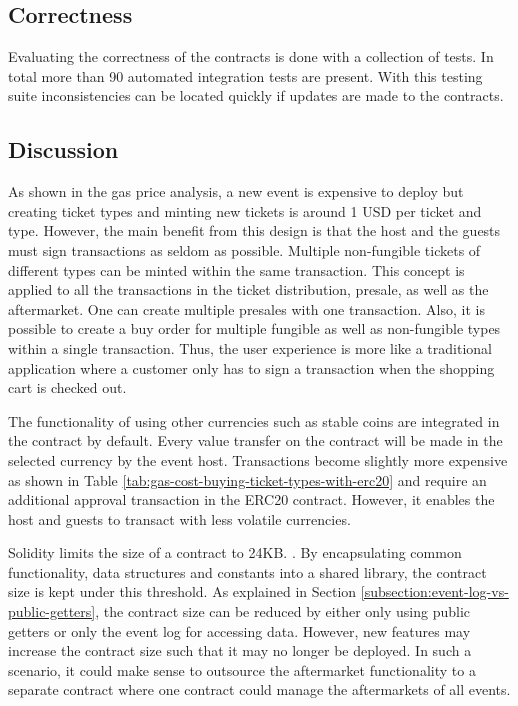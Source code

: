 \subsection{Correctness}
Evaluating the correctness of the contracts is done with a collection of tests. In total more than 90 automated integration tests are present. With this testing suite inconsistencies can be located quickly if updates are made to the contracts. 

\subsection{Discussion}\label{sec:discussion-evaluation-sc}
As shown in the gas price analysis, a new event is expensive to deploy but creating ticket types and minting new tickets is around 1 USD per ticket and type. However, the main benefit from this design is that the host and the guests must sign transactions as seldom as possible. Multiple non-fungible tickets of different types can be minted within the same transaction. This concept is applied to all the transactions in the ticket distribution, presale, as well as the aftermarket. One can create multiple presales with one transaction. Also, it is possible to create a buy order for multiple fungible as well as non-fungible types within a single transaction. Thus, the user experience is more like a traditional application where a customer only has to sign a transaction when the shopping cart is checked out.

The functionality of using other currencies such as stable coins are integrated in the contract by default. Every value transfer on the contract will be made in the selected currency by the event host. Transactions become slightly more expensive as shown in Table \ref{tab:gas-cost-buying-ticket-types-with-erc20} and require an additional approval transaction in the ERC20 contract. However, it enables the host and guests to transact with less volatile currencies. 

Solidity limits the size of a contract to 24KB. \cite{solidity-contract-size}. By encapsulating common functionality, data structures and constants into a shared library, the contract size is kept under this threshold. As explained in Section \ref{subsection:event-log-vs-public-getters}, the contract size can be reduced by either only using public getters or only the event log for accessing data. However, new features may increase the contract size such that it may no longer be deployed. In such a scenario, it could make sense to outsource the aftermarket functionality to a separate contract where one contract could manage the aftermarkets of all events.

